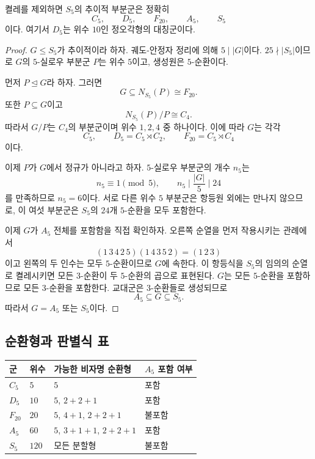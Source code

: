 \begin{theorem}
\label{thm:transitive-subgroups-s5}
켤레를 제외하면 $S_5$의 추이적 부분군은 정확히
\[
  C_5,\qquad D_5,\qquad F_{20},\qquad A_5,\qquad S_5
\]
이다. 여기서 $D_5$는 위수 $10$인 정오각형의 대칭군이다.
\end{theorem}

\begin{proof}
$G\le S_5$가 추이적이라 하자. 궤도-안정자 정리에 의해 $5\mid|G|$이다. $25\nmid|S_5|$이므로 $G$의 $5$-실로우 부분군 $P$는 위수 $5$이고, 생성원은 $5$-순환이다.

먼저 $P\trianglelefteq G$라 하자. 그러면
\[
  G\subseteq N_{S_5}(P)\cong F_{20}.
\]
또한 $P\subseteq G$이고
\[
  N_{S_5}(P)/P\cong C_4.
\]
따라서 $G/P$는 $C_4$의 부분군이며 위수 $1,2,4$ 중 하나이다. 이에 따라 $G$는 각각
\[
  C_5,\qquad D_5=C_5\rtimes C_2,\qquad
  F_{20}=C_5\rtimes C_4
\]
이다.

이제 $P$가 $G$에서 정규가 아니라고 하자. $5$-실로우 부분군의 개수 $n_5$는
\[
  n_5\equiv1\pmod5,
  \qquad
  n_5\mid\frac{|G|}{5}\mid24
\]
를 만족하므로 $n_5=6$이다. 서로 다른 위수 $5$ 부분군은 항등원 외에는 만나지 않으므로, 이 여섯 부분군은 $S_5$의 $24$개 $5$-순환을 모두 포함한다.

이제 $G$가 $A_5$ 전체를 포함함을 직접 확인하자. 오른쪽 순열을 먼저 작용시키는 관례에서
\[
  (1\,3\,4\,2\,5)(1\,4\,3\,5\,2)
  =(1\,2\,3)
\]
이고 왼쪽의 두 인수는 모두 $5$-순환이므로 $G$에 속한다. 이 항등식을 $S_5$의 임의의 순열로 켤레시키면 모든 $3$-순환이 두 $5$-순환의 곱으로 표현된다. $G$는 모든 $5$-순환을 포함하므로 모든 $3$-순환을 포함한다. 교대군은 $3$-순환들로 생성되므로
\[
  A_5\subseteq G\subseteq S_5.
\]
따라서 $G=A_5$ 또는 $S_5$이다.
\end{proof}

\subsection{순환형과 판별식 표}

\begin{center}
\renewcommand{\arraystretch}{1.22}
\begin{tabular}{llll}
\toprule
군 & 위수 & 가능한 비자명 순환형 & $A_5$ 포함 여부 \\
\midrule
$C_5$ & $5$ & $5$ & 포함 \\
$D_5$ & $10$ & $5$, $2+2+1$ & 포함 \\
$F_{20}$ & $20$ & $5$, $4+1$, $2+2+1$ & 불포함 \\
$A_5$ & $60$ & $5$, $3+1+1$, $2+2+1$ & 포함 \\
$S_5$ & $120$ & 모든 분할형 & 불포함 \\
\bottomrule
\end{tabular}
\end{center}

